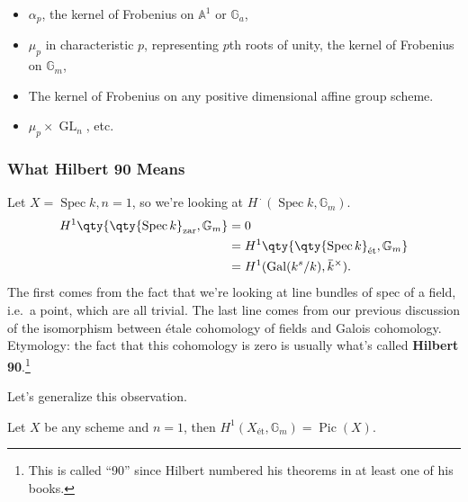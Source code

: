\begin{example}

\envlist

\begin{itemize}
\tightlist
\item
  \(\alpha_p\), the kernel of Frobenius on \({\mathbb{A}}^1\) or
  \({\mathbb{G}}_a\),
\item
  \(\mu_p\) in characteristic \(p\), representing \(p\)th roots of
  unity, the kernel of Frobenius on \({\mathbb{G}}_m\),
\item
  The kernel of Frobenius on any positive dimensional affine group
  scheme.
\item
  \(\mu_p \times\operatorname{GL}_n\), etc.
\end{itemize}

\end{example}

\hypertarget{what-hilbert-90-means}{%
\subsubsection{What Hilbert 90 Means}\label{what-hilbert-90-means}}

\begin{example}[?]

Let \(X = \operatorname{Spec}k, n=1\), so we're looking at
\(H^{\,\cdot\,}(\operatorname{Spec}k, {\mathbb{G}}_m)\).
\begin{align*}  
H^1 \qty{ \qty{ \operatorname{Spec}k}_{\mathrm{zar}}, {\mathbb{G}}_m} 
&= 0 \\
&= 
H^1 \qty{ \qty{ \operatorname{Spec}k}_\text{ét}, {\mathbb{G}}_m}  \\
&=
H^1(\operatorname{Gal}(k^s / k), \mkern 1.5mu\overline{\mkern-1.5muk\mkern-1.5mu}\mkern 1.5mu ^{\times})
.\end{align*}
The first comes from the fact that we're looking at line bundles of spec
of a field, i.e.~a point, which are all trivial. The last line comes
from our previous discussion of the isomorphism between étale cohomology
of fields and Galois cohomology. Etymology: the fact that this
cohomology is zero is usually what's called \textbf{Hilbert
90}.\footnote{This is called ``90'' since Hilbert numbered his theorems
  in at least one of his books.}

\end{example}

Let's generalize this observation.

\begin{example}[?]

Let \(X\) be any scheme and \(n=1\), then
\(H^1(X_\text{ét}, {\mathbb{G}}_m) = {\operatorname{Pic}}(X)\).

\end{example}

